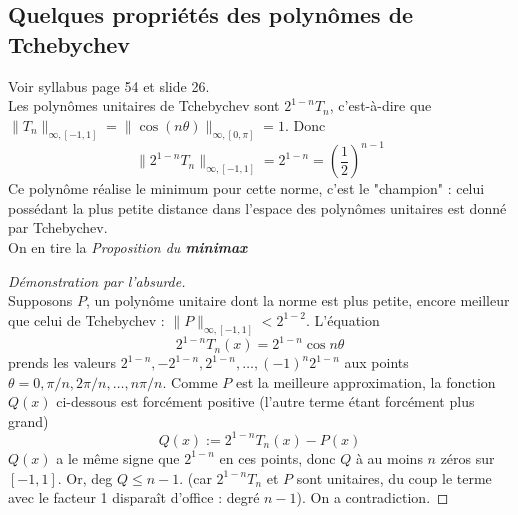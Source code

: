 	\setcounter{subsection}{3}
	\subsection{Quelques propriétés des polynômes de Tchebychev}
	Voir syllabus page 54 et slide 26.\\
	Les polynômes unitaires de Tchebychev sont $2^{1-n}T_n$, c'est-à-dire que $\|T_n
	\|_{\infty, [-1,1]} = \|\cos(n\theta)\|_{\infty, [0,\pi]} = 1$. Donc 
	\begin{equation}
	\|2^{1-n}T_n\|_{\infty,[-1,1]} = 2^{1-n} = \left(\frac{1}{2}\right)^{n-1}
	\end{equation}
	Ce polynôme réalise le minimum pour cette norme, c'est le "champion" : celui 
	possédant la plus petite distance dans l'espace des polynômes unitaires est 
	donné par Tchebychev.\\
	On en tire la \textit{Proposition du \textbf{minimax}}\\
	\begin{proof} [Démonstration par l'absurde]\ \\
	Supposons $P$, un polynôme unitaire dont la norme est plus petite, encore 
	meilleur que celui de Tchebychev : $\|P\|_{\infty, [-1,1]} < 2^{1-2}$. L'équation
	\begin{equation}
	2^{1-n}T_n(x) = 2^{1-n}\cos n\theta
	\end{equation}
	prends les valeurs $2^{1-n}, -2^{1-n}, 2^{1-n}, \dots, (-1)^n2^{1-n}$ aux points 
	$\theta = 0, \pi/n, 2\pi/n, \dots, n\pi/n$. Comme $P$ est la meilleure 
	approximation, la fonction $Q(x)$ ci-dessous est forcément positive (l'autre 
	terme étant forcément plus grand)
	\begin{equation}
	Q(x) := 2^{1-n}T_n(x) - P(x)
	\end{equation}
	$Q(x)$ a le même signe que $2^{1-n}$ en ces points, donc $Q$ à au moins $n$ 
	zéros sur $[-1,1]$. Or, deg $Q \leq n-1.$ (car $2^{1-n}T_n$ et $P$ sont unitaires, 
	du coup le terme avec le facteur 1 disparaît d'office : degré $n-1$). On a 
	contradiction.
	\end{proof}
	

